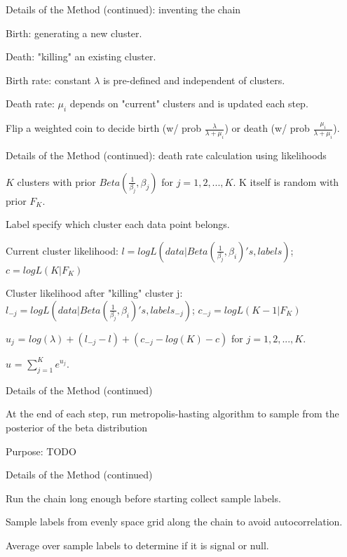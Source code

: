 \documentclass[10pt,mathserif]{beamer}
\begin{document}
\begin{frame} {Details of the Method (continued): inventing the chain}
\BIT
\item Birth: generating a new cluster.
\item Death: "killing" an existing cluster.
\item Birth rate: constant $\lambda$ is pre-defined and independent of clusters.
\item Death rate: $\mu_i$ depends on "current" clusters and is updated each step.
\item Flip a weighted coin to decide birth (w/ prob $\frac{\lambda}{\lambda+\mu_i}$) or death (w/ prob $\frac{\mu_i}{\lambda+\mu_i}$).
\EIT
\end{frame}

\begin{frame} {Details of the Method (continued): death rate calculation using likelihoods}
\BIT 
\item $K$ clusters with prior $Beta(\frac{1}{\beta_j}, \beta_j)$ for $j = 1,2, ..., K$. K itself is random with prior $F_K$.
\item Label specify which cluster each data point belongs.
\item Current cluster likelihood: $l = log L(data | Beta(\frac{1}{\beta_j}, \beta_i)'s, labels)$; $c = logL(K | F_K)$
\item Cluster likelihood after "killing" cluster j: $l_{-j} = log L(data | Beta(\frac{1}{\beta_j}, \beta_i)'s, labels_{-j})$; $c_{-j} = logL(K-1 | F_K)$
\item $u_j$ = $log(\lambda) + (l_{-j} - l) + (c_{-j} - log(K) - c)$ for $j = 1,2, ..., K$.
\item $u$ = $\sum_{j=1}^K e^{u_j}$.
\EIT
\end{frame}

\begin{frame} {Details of the Method (continued)}
\BIT 
\item At the end of each step, run metropolis-hasting algorithm to sample from the posterior of the beta distribution
\item Purpose: TODO

\EIT 
\end{frame}

\begin{frame} {Details of the Method (continued)}
\BIT 
\item Run the chain long enough before starting collect sample labels.
\item Sample labels from evenly space grid along the chain to avoid autocorrelation.
\item Average over sample labels to determine if it is signal or null.
\EIT 
\end{frame}
\end{document}

